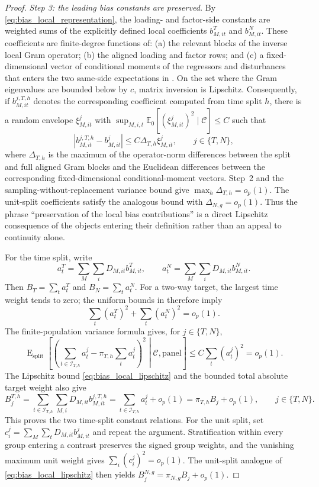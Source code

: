 \documentclass[11pt]{article}
\numberwithin{equation}{section}
\theoremstyle{remark}
\newcommand{\Ezero}{\mathbb E_0}
\begin{document}
\begin{proof}
\emph{Step 3: the leading bias constants are preserved.}
By \eqref{eq:bias_local_representation}, the loading- and factor-side constants are weighted sums of the explicitly defined local coefficients $b_{M,it}^{T}$ and $b_{M,it}^{N}$. These coefficients are finite-degree functions of: (a) the relevant blocks of the inverse local Gram operator; (b) the aligned loading and factor rows; and (c) a fixed-dimensional vector of conditional moments of the regressors and disturbances that enters the two same-side expectations in . On the set where the Gram eigenvalues are bounded below by $c$, matrix inversion is Lipschitz. Consequently, if $b_{M,it}^{j,T,h}$ denotes the corresponding coefficient computed from time split $h$, there is a random envelope $\xi_{M,it}^{j}$ with $\sup_{M,i,t}\Ezero[(\xi_{M,it}^{j})^2\mid\mathscr C]\le C$ such that
\begin{equation}
\label{eq:bias_local_lipschitz}
\left|
b_{M,it}^{j,T,h}-b_{M,it}^{j}
\right|
\le
C\Delta_{T,h}\xi_{M,it}^{j},
\qquad
j\in\{T,N\},
\end{equation}
where $\Delta_{T,h}$ is the maximum of the operator-norm differences between the split and full aligned Gram blocks and the Euclidean differences between the corresponding fixed-dimensional conditional-moment vectors. Step~2 and the sampling-without-replacement variance bound give $\max_h\Delta_{T,h}=o_p(1)$. The unit-split coefficients satisfy the analogous bound with $\Delta_{N,g}=o_p(1)$. Thus the phrase ``preservation of the local bias contributions'' is a direct Lipschitz consequence of the objects entering their definition rather than an appeal to continuity alone.

For the time split, write
$$
a_t^{T}=\sum_M\sum_iD_{M,it}b_{M,it}^{T},
\qquad
a_t^{N}=\sum_M\sum_iD_{M,it}b_{M,it}^{N}.
$$
Then $B_T=\sum_ta_t^{T}$ and $B_N=\sum_ta_t^{N}$. For a two-way target, the largest time weight tends to zero; the uniform bounds in  therefore imply
$$
\sum_t(a_t^{T})^2+\sum_t(a_t^{N})^2=o_p(1).
$$
The finite-population variance formula gives, for $j\in\{T,N\}$,
$$
\operatorname E_{\mathrm{split}}
\left[
\left(
\sum_{t\in\mathcal I_{T,h}}a_t^{j}
-\pi_{T,h}\sum_ta_t^{j}
\right)^2
\middle|\mathscr C,\text{panel}
\right]
\le C\sum_t(a_t^{j})^2=o_p(1).
$$
The Lipschitz bound \eqref{eq:bias_local_lipschitz} and the bounded total absolute target weight also give
$$
B_j^{T,h}
=
\sum_{t\in\mathcal I_{T,h}}\sum_{M,i}
D_{M,it}b_{M,it}^{j,T,h}
=
\sum_{t\in\mathcal I_{T,h}}a_t^j+o_p(1)
=
\pi_{T,h}B_j+o_p(1),
\qquad j\in\{T,N\}.
$$
This proves the two time-split constant relations. For the unit split, set $c_i^{j}=\sum_M\sum_tD_{M,it}b_{M,it}^{j}$ and repeat the argument. Stratification within every group entering a contrast preserves the signed group weights, and the vanishing maximum unit weight gives $\sum_i(c_i^{j})^2=o_p(1)$. The unit-split analogue of \eqref{eq:bias_local_lipschitz} then yields $B_j^{N,g}=\pi_{N,g}B_j+o_p(1)$.


\end{proof}
\end{document}
